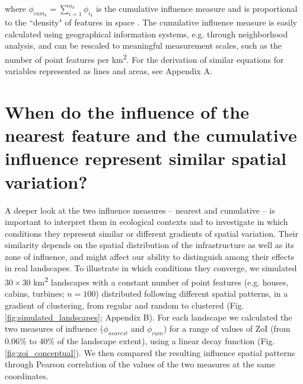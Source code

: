 \documentclass[titlepage]{article}
\begin{document}
where $\phi_{cum_k} = \sum_{i=1}^{n_k} \phi_{i_k}$ is the cumulative influence measure and is proportional to 
the ``density" of features in space \citep[e.g.][]{panzacchi_searching_2015}. The cumulative influence measure is easily calculated using geographical information systems, e.g. through neighborhood analysis, and can be rescaled to meaningful measurement scales, such as the number of point features per km\textsuperscript{2}. For the derivation of similar equations for variables represented as lines and areas, see Appendix A.


\section{When do the influence of the nearest feature and the cumulative influence represent similar spatial variation?}

A deeper look at the two influence measures -- nearest and cumulative -- is important to interpret them in ecological contexts and to investigate in which conditions they represent similar or different gradients of spatial variation. Their similarity depends on the spatial distribution of the infrastructure as well as its zone of influence, and might affect our ability to distinguish among their effects in real landscapes. To illustrate in which conditions they converge, we simulated $30 \times 30$ km\textsuperscript{2} landscapes with a constant number of point features (e.g. houses, cabins, turbines; $n = 100$) distributed following different spatial patterns, in a gradient of clustering, from regular and random to clustered (Fig. \ref{fig:simulated_landscapes}; Appendix B). For each landscape we calculated the two measures of influence ($\phi_{nearest}$ and $\phi_{cum}$) for a range of values of ZoI (from 0.06\% to 40\% of the landscape extent), using a linear decay function (Fig. \ref{fig:zoi_conceptual}). We then compared the resulting influence spatial patterns through Pearson correlation of the values of the two measures at the same coordinates. 
\end{document}
